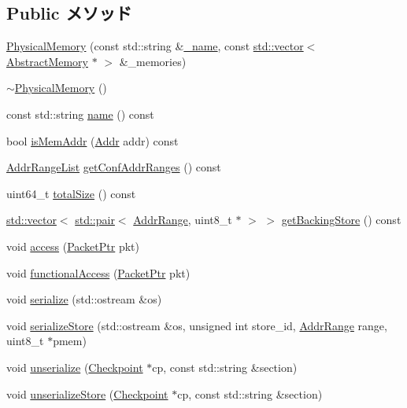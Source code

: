 \subsection*{Public メソッド}
\begin{DoxyCompactItemize}
\item 
\hyperlink{classPhysicalMemory_a987bb2d4a9b94b62fa15261e024019e5}{PhysicalMemory} (const std::string \&\hyperlink{classPhysicalMemory_aaf2ed934b37cbbd236fdd1b01a5f5005}{\_\-name}, const \hyperlink{classstd_1_1vector}{std::vector}$<$ \hyperlink{classAbstractMemory}{AbstractMemory} $\ast$ $>$ \&\_\-memories)
\item 
\hyperlink{classPhysicalMemory_ad6a6b96cf5b3ed869b4a6f06429fd4eb}{$\sim$PhysicalMemory} ()
\item 
const std::string \hyperlink{classPhysicalMemory_a6490f765a824ced1cc94979609fe7e07}{name} () const 
\item 
bool \hyperlink{classPhysicalMemory_a0faeadf06436f8123c7bda01087bb222}{isMemAddr} (\hyperlink{base_2types_8hh_af1bb03d6a4ee096394a6749f0a169232}{Addr} addr) const 
\item 
\hyperlink{classstd_1_1list}{AddrRangeList} \hyperlink{classPhysicalMemory_a564b079bb27347c8bd8430f009539623}{getConfAddrRanges} () const 
\item 
uint64\_\-t \hyperlink{classPhysicalMemory_a990c48a7ad4a4821fe4f04a1e58845a6}{totalSize} () const 
\item 
\hyperlink{classstd_1_1vector}{std::vector}$<$ \hyperlink{classstd_1_1pair}{std::pair}$<$ \hyperlink{classAddrRange}{AddrRange}, uint8\_\-t $\ast$ $>$ $>$ \hyperlink{classPhysicalMemory_a57d8785b312d1d1a53c4beb67a019d46}{getBackingStore} () const 
\item 
void \hyperlink{classPhysicalMemory_aac5d96736802cb79fb2287135bcc1dff}{access} (\hyperlink{classPacket}{PacketPtr} pkt)
\item 
void \hyperlink{classPhysicalMemory_ace845b5316308e12fd958fa5df09a8e8}{functionalAccess} (\hyperlink{classPacket}{PacketPtr} pkt)
\item 
void \hyperlink{classPhysicalMemory_a53e036786d17361be4c7320d39c99b84}{serialize} (std::ostream \&os)
\item 
void \hyperlink{classPhysicalMemory_adda88c8306de32c98ea608a0a85c3dcd}{serializeStore} (std::ostream \&os, unsigned int store\_\-id, \hyperlink{classAddrRange}{AddrRange} range, uint8\_\-t $\ast$pmem)
\item 
void \hyperlink{classPhysicalMemory_af22e5d6d660b97db37003ac61ac4ee49}{unserialize} (\hyperlink{classCheckpoint}{Checkpoint} $\ast$cp, const std::string \&section)
\item 
void \hyperlink{classPhysicalMemory_ad180e1b910a31a4f7e6ad1a701c8a286}{unserializeStore} (\hyperlink{classCheckpoint}{Checkpoint} $\ast$cp, const std::string \&section)
\end{DoxyCompactItemize}
